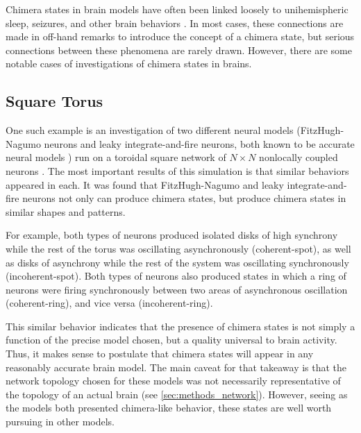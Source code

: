 Chimera states in brain models have often been linked loosely to
unihemispheric sleep,
seizures,
and other brain behaviors \cite{Abrams2008,Panaggio2015,Martens2013,Abrams2004,Shanahan2010}.
In most cases,
these connections are made in off-hand remarks to introduce the concept of a chimera state,
but serious connections between these phenomena are rarely drawn.
However,
there are some notable cases of investigations of chimera states in brains.

\subsection{Square Torus}
\label{sec:lit_review_chimera_square_torus}
One such example is an investigation of two different neural models
(FitzHugh-Nagumo neurons and leaky integrate-and-fire neurons, both known to be accurate neural models \cite{Deco2008})
run on a toroidal square network of $N \times N$ nonlocally coupled neurons \cite{Schmidt2017}.
The most important results of this simulation is that similar behaviors appeared in each.
It was found that FitzHugh-Nagumo and leaky integrate-and-fire neurons not only can produce chimera states,
but produce chimera states in similar shapes and patterns.

For example,
both types of neurons produced isolated disks of high synchrony while the rest of the torus was oscillating asynchronously (coherent-spot),
as well as disks of asynchrony while the rest of the system was oscillating synchronously (incoherent-spot).
Both types of neurons also produced states in which a ring of neurons were firing synchronously
between two areas of asynchronous oscillation (coherent-ring),
and vice versa (incoherent-ring).

This similar behavior indicates that the presence of chimera states is not simply a function of the precise model chosen,
but a quality universal to brain activity.
Thus, it makes sense to postulate that chimera states will appear in any reasonably accurate brain model.
The main caveat for that takeaway is that the network topology chosen for these models was not necessarily representative of the topology of an actual brain (see \cref{sec:methods_network}).
However, seeing as the models both presented chimera-like behavior,
these states are well worth pursuing in other models.

